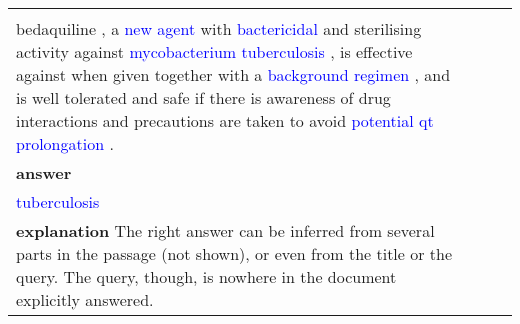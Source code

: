 \documentclass[11pt,a4paper]{article}
\begin{document}
\begin{table}[t]
\begin{tabular}{p{2.7cm} p{1.8cm} l r}
{\subsection{Meta knowledge}
\noindent
\textbf{query}\\
bedaquiline , a \textcolor{blue}{new agent} with \textcolor{blue}{bactericidal} and sterilising activity against \textcolor{blue}{mycobacterium tuberculosis} , is effective against \textcolor{blue}{\textbf{\underline{\hspace{2cm}}}} when given together with a \textcolor{blue}{background regimen} , and is well tolerated and safe if there is awareness of drug interactions and precautions are taken to avoid \textcolor{blue}{potential qt prolongation} .\\
\textbf{answer}\\
\textcolor{blue}{tuberculosis}\\
\textbf{explanation}
The right answer can be inferred from several parts in the passage (not shown), or even from the title or the query. The query, though, is nowhere in the document explicitly answered.



\begin{comment}
Error analysis

ga-reader, \textsc{No-Ent}, 
a_hat=treatment
requires bridging, but GA reader gets it wrong.
bcr-2013-200832.4


\end{comment}}
\end{tabular}
\end{table}
\end{document}
